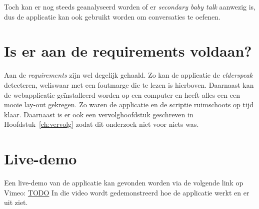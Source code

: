 Toch kan er nog steeds geanalyseerd worden of er \textit{secondary baby talk} aanwezig is, dus de applicatie kan ook gebruikt worden om conversaties te oefenen.

\section{Is er aan de requirements voldaan?}
Aan de \textit{requirements} zijn wel degelijk gehaald. Zo kan de applicatie de \textit{elderspeak} detecteren, weliswaar met een foutmarge die te lezen is hierboven.
Daarnaast kan de webapplicatie geïnstalleerd worden op een computer en heeft alles een een mooie lay-out gekregen.
Zo waren de applicatie en de scriptie ruimschoots op tijd klaar. Daarnaast is er ook een vervolghoofdstuk geschreven in Hoofdstuk~\ref{ch:vervolg} zodat dit onderzoek niet voor niets was.

\section{Live-demo}
Een live-demo van de applicatie kan gevonden worden via de volgende link op Vimeo: \url{TODO}
In die video wordt gedemonstreerd hoe de applicatie werkt en er uit ziet.
